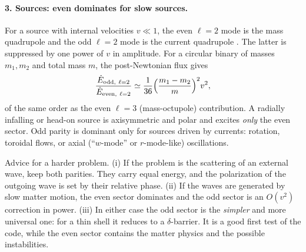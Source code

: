 \paragraph{3. Sources: even dominates for slow sources.} For a source with internal velocities $v\ll1$, the even
$\ell=2$ mode is the mass quadrupole and the odd $\ell=2$ mode is the current quadrupole \cite{Thorne80}. The latter is
suppressed by one power of $v$ in amplitude. For a circular binary of masses $m_1,m_2$ and total mass $m$, the post-Newtonian
flux gives \cite{Blanchet14}
\begin{equation}
\frac{\dot E_{\rm odd,\ \ell=2}}{\dot E_{\rm even,\ \ell=2}}\simeq\frac{1}{36}\Big(\frac{m_1-m_2}{m}\Big)^2v^2 ,
\end{equation}
of the same order as the even $\ell=3$ (mass-octupole) contribution. A radially infalling or head-on source is
axisymmetric and polar and excites \emph{only} the even sector. Odd parity is dominant only for sources driven by
currents: rotation, toroidal flows, or axial (``$w$-mode'' or $r$-mode-like) oscillations.

\begin{keyidea}
Advice for a harder problem. (i) If the problem is the scattering of an external wave, keep both parities. They carry equal
energy, and the polarization of the outgoing wave is set by their relative phase. (ii) If the waves are generated by slow
matter motion, the even sector dominates and the odd sector is an $O(v^2)$ correction in power. (iii) In either case the
odd sector is the \emph{simpler} and more universal one: for a thin shell it reduces to a $\delta$-barrier. It is a
good first test of the code, while the even sector contains the matter physics and the possible instabilities.
\end{keyidea}
